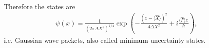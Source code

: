 \documentclass[11pt,a4paper]{scrartcl}
\begin{document}
\begin{enumerate}[label=(\alph*)]
\begin{calculationbox}
        Therefore the states are
        \begin{align*}
            \psi(x)
            = \frac{1}{(2\pi \Delta X^2)^{1/4}}
            \exp\!\left(
                -\frac{(x-\langle \hat{X}\rangle)^2}{4\Delta X^2}
                + i\frac{\langle \hat{P}\rangle x}{\hbar}
            \right),
        \end{align*}
        i.e. Gaussian wave packets, also called minimum-uncertainty states.
    \end{calculationbox}
\end{enumerate}
\end{document}
